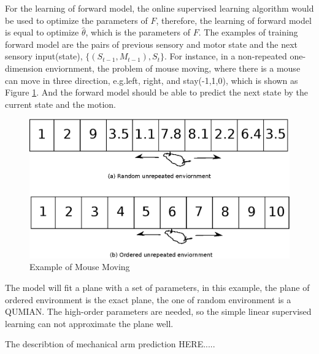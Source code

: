 \documentclass{article}
\begin{document}
For the learning of forward model, the online supervised learning algorithm would be used to optimize the parameters of $F$, therefore, the learning of forward model is equal to optimize $\hat{\theta}$, which is the parameters of $F$.
The examples of training forward model are the pairs of previous sensory and motor state and the next sensory input(state), $\{(S_{t-1}, M_{t-1}), S_t\}$. For instance, in a non-repeated one-dimension enviornment, the problem of mouse moving, where there is a mouse can move in three direction, e.g.left, right, and stay(-1,1,0), which is shown as Figure \ref{fig:mousemoving}. And the forward model should be able to predict the next state by the current state and the motion. 
\begin{figure}
  \centering
  \includegraphics[scale=0.5]{fig/example_mouse.eps}
  \caption{Example of Mouse Moving}
  \label{fig:mousemoving}
\end{figure}
The model will fit a plane with a set of parameters, in this example, the plane of ordered environment is the exact plane, the one of random environment is a QUMIAN. The high-order parameters are needed, so the simple linear supervised learning can not approximate the plane well. 

The describtion of mechanical arm prediction HERE.....
\end{document}
